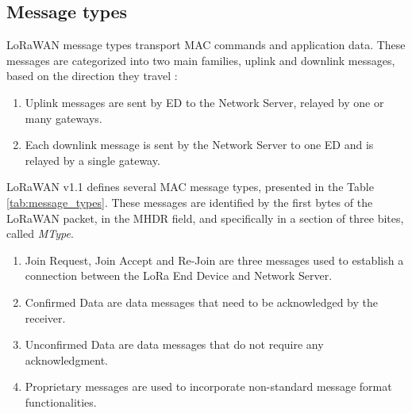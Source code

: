 \subsection{Message types}
LoRaWAN message types transport MAC commands and application data. These messages are categorized into two main families, uplink and downlink messages, based on the direction they travel \cite{the_things_network_2021}:
\begin{enumerate}
	\item Uplink messages are sent by ED to the Network Server, relayed by one or many gateways.
	\item Each downlink message is sent by the Network Server to one ED and is relayed by a single gateway.
\end{enumerate}
LoRaWAN v1.1 defines several MAC message types, presented in the Table \ref{tab:message_types}. These messages are identified by the first bytes of the LoRaWAN packet, in the MHDR field, and specifically in a section of three bites, called \textit{MType}.

\begin{enumerate}
	\item Join Request, Join Accept and Re-Join are three messages used to establish a connection between the LoRa End Device and Network Server.
	\item Confirmed Data are data messages that need to be acknowledged by the receiver.
	\item Unconfirmed Data are data messages that do not require any acknowledgment.
	\item Proprietary messages are used to incorporate non-standard message format functionalities.
\end{enumerate}

